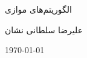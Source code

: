 \documentclass[20pt, a4paper]{article}
\begin{document}
\centerline{الگوریتم‌های موازی}
\centerline{علیرضا سلطانی نشان}
\centerline{\today}
\tableofcontents
\end{document}
